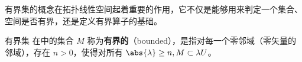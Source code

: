 
有界集的概念在拓扑线性空间起着重要的作用，它不仅是能够用来判定一个集合、空间是否有界，还是定义有界算子的基础。

\begin{definition}{有界集}
在中的集合 $M$ 称为\textbf{有界的}（bounded），是指对每一个零邻域（零矢量的邻域），存在 $n>0$，使得对所有 $\abs{\lambda}\geq n,M\subset \lambda U$。 
\end{definition}
